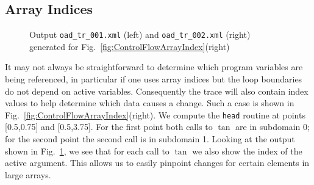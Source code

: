 \documentclass{article}
\newcommand{\reffig}[1]{{Fig.~\ref{#1}}}
\begin{document}
\subsection{Array Indices}\label{sec:ArrayIndex}
\begin{figure}
\begin{minipage}{.5\textwidth}

\end{minipage}
\begin{minipage}{.46\textwidth}

\end{minipage}
\caption{Output \lstinline{oad_tr_001.xml} (left) 
and \lstinline{oad_tr_002.xml} (right) 
generated for \reffig{fig:ControlFlowArrayIndex}(right)}\label{fig:ArrayIndexOutput}
\end{figure}
It may not always be straightforward to determine which program variables 
are being referenced, in particular if one uses array indices but the loop 
boundaries do not depend on active variables. Consequently the trace will 
also contain index values to help determine which data causes a change. 
Such a case is shown in \reffig{fig:ControlFlowArrayIndex}(right).
We compute the \lstinline{head} routine at points [0.5,0.75] and [0.5,3.75].
For the first point both calls to $\tan$ are in subdomain 0; for the second 
point the second call is in subdomain 1. Looking at the output shown in \reffig{fig:ArrayIndexOutput},
we see that for each call to $\tan$ we also show the index of the active argument. 
This allows us to easily pinpoint changes for certain elements in large arrays.    
\end{document}
